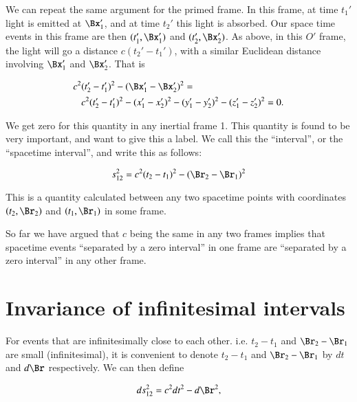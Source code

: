We can repeat the same argument for the primed frame.  In this frame, at time \(t_1'\) light is emitted at \(\Bx_1'\), and at time \(t_2'\) this light is absorbed.  Our space time events in this frame are then \((t_1', \Bx_1')\) and \((t_2', \Bx_2')\).  As above, in this \(O'\) frame, the light will go a distance \(c(t_2' - t_1')\), with a similar Euclidean distance involving \(\Bx_1'\) and \(\Bx_2'\).  That is

\begin{equation}\label{eqn:relativisticElectrodynamicsL2:40}
\begin{aligned}
c^2 &(t_2' - t_1')^2 - (\Bx_1' - \Bx_2')^2 = \\
&c^2 (t_2' - t_1')^2
- (x_1' - x_2')^2
- (y_1' - y_2')^2
- (z_1' - z_2')^2 = 0.
\end{aligned}
\end{equation}

We get zero for this quantity in any inertial frame 1.  This quantity is found to be very important, and want to give this a label.  We call this the ``interval'', or the ``spacetime interval'', and write this as follows:

\begin{equation}\label{eqn:relativisticElectrodynamicsL2:50}
s_{12}^2 = c^2 (t_2 - t_1)^2 - (\Br_2 - \Br_1)^2
\end{equation}

This is a quantity calculated between any two spacetime points with coordinates \((t_2, \Br_2)\) and \((t_1, \Br_1)\) in some frame.

So far we have argued that \(c\) being the same in any two frames implies that spacetime events ``separated by a zero interval'' in one frame are ``separated by a zero interval'' in any other frame.

\section{Invariance of infinitesimal intervals}

For events that are infinitesimally close to each other.  i.e. \(t_2 - t_1\) and \(\Br_2 -\Br_1\) are small (infinitesimal), it is convenient to denote \(t_2 - t_1\) and \(\Br_2 - \Br_1\) by \(dt\) and \(d\Br\) respectively.  We can then define

\begin{equation}\label{eqn:relativisticElectrodynamicsL2:60}
ds_{12}^2 = c^2 dt^2 - d\Br^2,
\end{equation}

